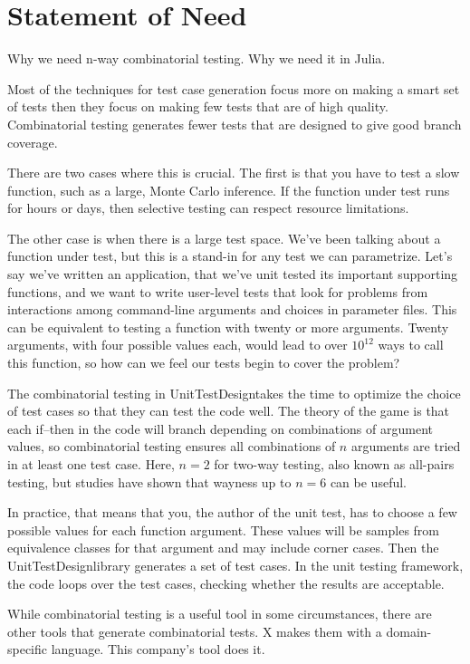 \documentclass{juliacon}
\newcommand{\utd}{UnitTestDesign}
\begin{document}
\section{Statement of Need}

Why we need n-way combinatorial testing. Why we need it in Julia.

Most of the techniques for test case generation focus more on making a smart set of tests then they focus on making few tests that are of high quality. Combinatorial testing generates fewer tests that are designed to give good branch coverage.

There are two cases where this is crucial. The first is that you have to test a slow function, such as a large, Monte Carlo inference. If the function under test runs for hours or days, then selective testing can respect resource limitations.

The other case is when there is a large test space. We've been talking about a function under test, but this is a stand-in for any test we can parametrize. Let's say we've written an application, that we've unit tested its important supporting functions, and we want to write user-level tests that look for problems from interactions among command-line arguments and choices in parameter files. This can be equivalent to testing a function with twenty or more arguments. Twenty arguments, with four possible values each, would lead to over $10^12$ ways to call this function, so how can we feel our tests begin to cover the problem?

The combinatorial testing in \utd takes the time to optimize the choice of test cases so that they can test the code well. The theory of the game is that each if--then in the code will branch depending on combinations of argument values, so combinatorial testing ensures all combinations of $n$ arguments are tried in at least one test case. Here, $n=2$ for two-way testing, also known as all-pairs testing, but studies have shown that wayness up to $n=6$ can be useful.

In practice, that means that you, the author of the unit test, has to choose a few possible values for each function argument. These values will be samples from equivalence classes for that argument and may include corner cases. Then the \utd library generates a set of test cases. In the unit testing framework, the code loops over the test cases, checking whether the results are acceptable.

While combinatorial testing is a useful tool in some circumstances, there are other tools that generate combinatorial tests. X makes them with a domain-specific language. This company's tool does it.
\end{document}
